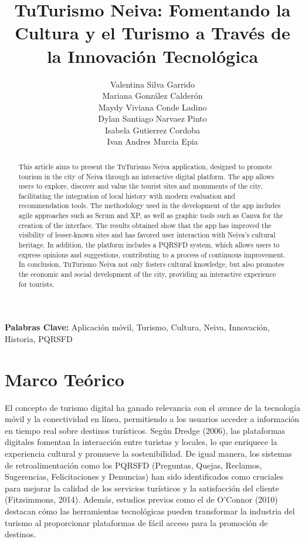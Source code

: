 \documentclass{article}
\title{\textbf{TuTurismo Neiva: Fomentando la Cultura y el Turismo a Través de la Innovación Tecnológica}}
\author{
    Valentina Silva Garrido \texttt{} \\
    Mariana González Calderón \texttt{} \\
    Maydy Viviana Conde Ladino \texttt{} \\
    Dylan Santiago Narvaez Pinto \texttt{} \\
    Isabela Gutierrez Cordoba \texttt{} \\
    Ivan Andres Murcia Epia \texttt{}
}
\begin{document}
\maketitle

\begin{abstract}
This article aims to present the TuTurismo Neiva application, designed to promote tourism in the city of Neiva through an interactive digital platform. The app allows users to explore, discover and value the tourist sites and monuments of the city, facilitating the integration of local history with modern evaluation and recommendation tools. The methodology used in the development of the app includes agile approaches such as Scrum and XP, as well as graphic tools such as Canva for the creation of the interface. The results obtained show that the app has improved the visibility of lesser-known sites and has favored user interaction with Neiva's cultural heritage. In addition, the platform includes a PQRSFD system, which allows users to express opinions and suggestions, contributing to a process of continuous improvement. In conclusion, TuTurismo Neiva not only fosters cultural knowledge, but also promotes the economic and social development of the city, providing an interactive experience for tourists.
\end{abstract}

\textbf{Palabras Clave:} Aplicación móvil, Turismo, Cultura, Neiva, Innovación, Historia, PQRSFD

\section{Marco Teórico}
El concepto de turismo digital ha ganado relevancia con el avance de la tecnología móvil y la conectividad en línea, permitiendo a los usuarios acceder a información en tiempo real sobre destinos turísticos. Según Dredge (2006), las plataformas digitales fomentan la interacción entre turistas y locales, lo que enriquece la experiencia cultural y promueve la sostenibilidad. De igual manera, los sistemas de retroalimentación como los PQRSFD (Preguntas, Quejas, Reclamos, Sugerencias, Felicitaciones y Denuncias) han sido identificados como cruciales para mejorar la calidad de los servicios turísticos y la satisfacción del cliente (Fitzsimmons, 2014). Además, estudios previos como el de O'Connor (2010) destacan cómo las herramientas tecnológicas pueden transformar la industria del turismo al proporcionar plataformas de fácil acceso para la promoción de destinos.
\end{document}
